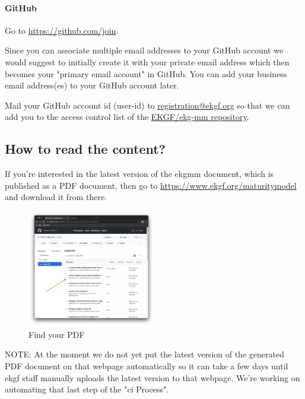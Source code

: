 \paragraph{GitHub}

Go to \url{https://github.com/join}.

Since you can associate multiple email addresses to your GitHub account we would
suggest to initially create it with your private email address which then becomes
your "primary email account" in GitHub.
You can add your business email address(es) to your GitHub account later.

Mail your GitHub account id (user-id) to
\href{mailto:registration@ekgf.org}{registration@ekgf.org} so that we can add you
to the access control list of the \href{https://github.com/EKGF/ekg-mm}{EKGF/ekg-mm repository}.

\pagebreak
\subsection{How to read the content?}

If you’re interested in the latest version of the \gls{ekgmm} document,
which is published as a PDF document, then go to
\url{https://www.ekgf.org/maturitymodel} and download it from there.

\begin{figure}
    \vspace{-12pt}
    \begin{center}
        \includegraphics[width=0.50\textwidth]{../images/ekgmm-process-create-pdf-workflow.png}
    \end{center}
    \caption{Find your PDF}
    \label{fig:ekgmm-process-find-your-pdf}
\end{figure}

NOTE: At the moment we do not yet put the latest version of the generated 
PDF document on that webpage automatically so it can take a few days until 
\gls{ekgf} staff manually uploads the latest version to that webpage. 
We’re working on automating that last step of the "\gls{ci} Process".

